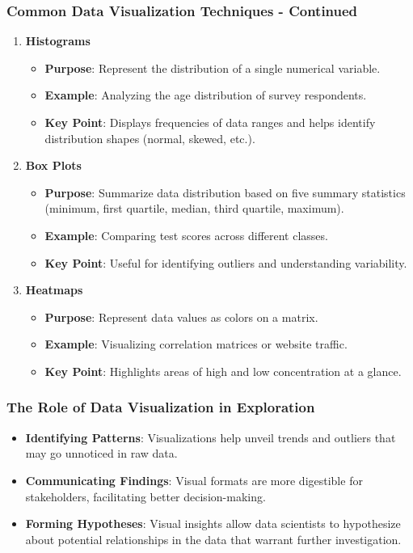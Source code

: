 \documentclass[aspectratio=169]{beamer}
\begin{document}
\begin{frame}[fragile]
  \frametitle{Common Data Visualization Techniques - Continued}
  \begin{enumerate}[resume]
    \item \textbf{Histograms}
      \begin{itemize}
        \item \textbf{Purpose}: Represent the distribution of a single numerical variable.
        \item \textbf{Example}: Analyzing the age distribution of survey respondents.
        \item \textbf{Key Point}: Displays frequencies of data ranges and helps identify distribution shapes (normal, skewed, etc.).
      \end{itemize}

    \item \textbf{Box Plots}
      \begin{itemize}
        \item \textbf{Purpose}: Summarize data distribution based on five summary statistics (minimum, first quartile, median, third quartile, maximum).
        \item \textbf{Example}: Comparing test scores across different classes.
        \item \textbf{Key Point}: Useful for identifying outliers and understanding variability.
      \end{itemize}

    \item \textbf{Heatmaps}
      \begin{itemize}
        \item \textbf{Purpose}: Represent data values as colors on a matrix.
        \item \textbf{Example}: Visualizing correlation matrices or website traffic.
        \item \textbf{Key Point}: Highlights areas of high and low concentration at a glance.
      \end{itemize}
  \end{enumerate}
\end{frame}

\begin{frame}[fragile]
  \frametitle{The Role of Data Visualization in Exploration}
  \begin{itemize}
    \item \textbf{Identifying Patterns}: 
      Visualizations help unveil trends and outliers that may go unnoticed in raw data.
    \item \textbf{Communicating Findings}: 
      Visual formats are more digestible for stakeholders, facilitating better decision-making.
    \item \textbf{Forming Hypotheses}: 
      Visual insights allow data scientists to hypothesize about potential relationships in the data that warrant further investigation.
  \end{itemize}
\end{frame}
\end{document}
